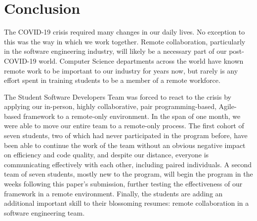 \section{Conclusion}
The COVID-19 crisis required many changes in our daily lives. No exception to this was the way in which we work together. Remote collaboration, particularly in the software engineering industry, will likely be a necessary part of our post-COVID-19 world. Computer Science departments across the world have known remote work to be important to our industry for years now, but rarely is any effort spent in training students to be a member of a remote workforce.

The Student Software Developers Team was forced to react to the crisis by applying our in-person, highly collaborative, pair programming-based, Agile-based framework to a remote-only environment. In the span of one month, we were able to move our entire team to a remote-only process. The first cohort of seven students, two of which had never participated in the program before, have been able to continue the work of the team without an obvious negative impact on efficiency and code quality, and despite our distance, everyone is communicating effectively with each other, including paired individuals. A second team of seven students, mostly new to the program, will begin the program in the weeks following this paper's submission, further testing the effectiveness of our framework in a remote environment. Finally, the students are adding an additional important skill to their blossoming resumes: remote collaboration in a software engineering team.
